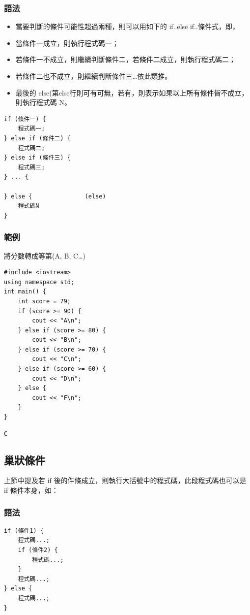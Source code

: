 \documentclass[12pt,a4paper]{article}
\begin{document}
\subsubsection{語法}
\label{sec:org3e99e7e}
\begin{itemize}
\item 當要判斷的條件可能性超過兩種，則可以用如下的 if..else if..條件式，即，
\item 當條件一成立，則執行程式碼一；
\item 若條件一不成立，則繼續判斷條件二，若條件二成立，則執行程式碼二；
\item 若條件二也不成立，則繼續判斷條件三\ldots{}依此類推。
\item 最後的 else(第else行則可有可無，若有，則表示如果以上所有條件皆不成立，則執行程式碼 N。
\end{itemize}
\lstset{breaklines=true,language=cpp,label= ,caption= ,captionpos=b,numbers=none}
\begin{lstlisting}
if (條件一) {
    程式碼一;
} else if (條件二) {
    程式碼二;
} else if (條件三) {
    程式碼三;
} ... {

} else {               (else)
    程式碼N
}
\end{lstlisting}

\subsubsection{範例}
\label{sec:orge5cbdb2}
將分數轉成等第(A, B, C\ldots{})
\lstset{breaklines=true,language=cpp,label= ,caption= ,captionpos=b,firstnumber=1,numbers=left}
\begin{lstlisting}
#include <iostream>
using namespace std;
int main() {
    int score = 79;
    if (score >= 90) {
        cout << "A\n";
    } else if (score >= 80) {
        cout << "B\n";
    } else if (score >= 70) {
        cout << "C\n";
    } else if (score >= 60) {
        cout << "D\n";
    } else {
        cout << "F\n";
    }
}
\end{lstlisting}

\begin{verbatim}
C
\end{verbatim}

\subsection{巢狀條件}
\label{sec:org4168ef5}
上節中提及若 if 後的件條成立，則執行大括號中的程式碼，此段程式碼也可以是 if 條件本身，如：
\subsubsection{語法}
\label{sec:org37303e0}
\lstset{breaklines=true,language=cpp,label= ,caption= ,captionpos=b,numbers=none}
\begin{lstlisting}
if (條件1) {
    程式碼...;
    if (條件2) {
        程式碼...;
    }
    程式碼...;
} else {
    程式碼...;
}
\end{lstlisting}
\end{document}
